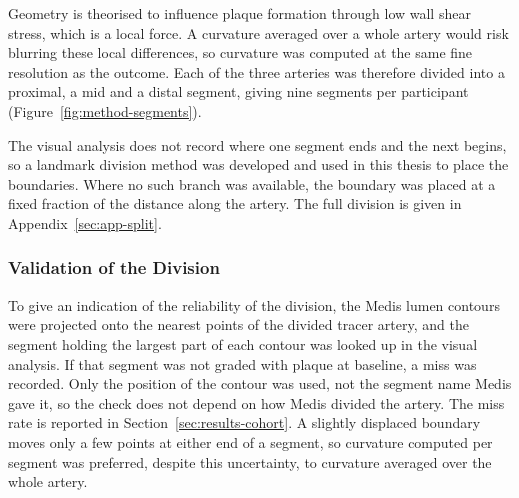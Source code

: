 Geometry is theorised to influence plaque formation through low wall shear stress, which is a local force. 
A curvature averaged over a whole artery would risk blurring these local differences, so curvature was computed at the same fine resolution as the outcome.
Each of the three arteries was therefore divided into a proximal, a mid and a distal segment, giving nine segments per participant (Figure~\ref{fig:method-segments}).

The visual analysis does not record where one segment ends and the next begins, so a landmark division method was developed and used in this thesis to place the boundaries.
Where no such branch was available, the boundary was placed at a fixed fraction of the distance along the artery.
The full division is given in Appendix~\ref{sec:app-split}.


\subsubsection{Validation of the Division}
\label{sec:method-split-validation}

To give an indication of the reliability of the division, the Medis lumen contours were projected onto the nearest points of the divided tracer artery, and the segment holding the largest part of each contour was looked up in the visual analysis.
If that segment was not graded with plaque at baseline, a miss was recorded.
Only the position of the contour was used, not the segment name Medis gave it, so the check does not depend on how Medis divided the artery.
The miss rate is reported in Section~\ref{sec:results-cohort}.
A slightly displaced boundary moves only a few points at either end of a segment, so curvature computed per segment was preferred, despite this uncertainty, to curvature averaged over the whole artery.
